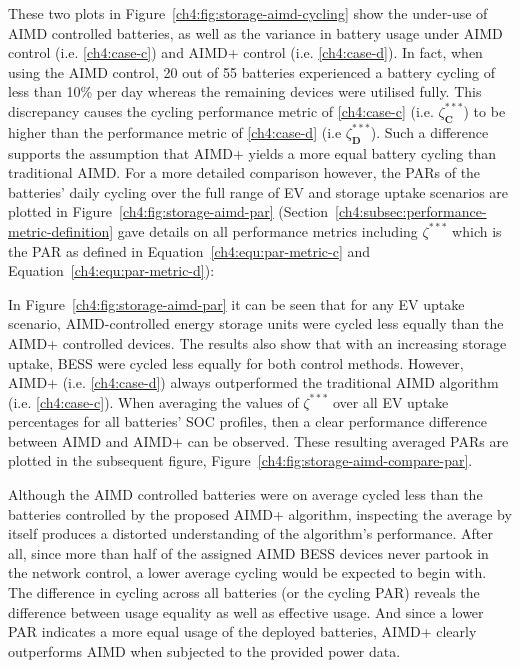 These two plots in Figure~\ref{ch4:fig:storage-aimd-cycling} show the under-use of AIMD controlled batteries, as well as the variance in battery usage under AIMD control (i.e. \ref{ch4:case-c}) and AIMD+ control (i.e. \ref{ch4:case-d}).
In fact, when using the AIMD control, 20 out of 55 batteries experienced a battery cycling of less than 10\% per day whereas the remaining devices were utilised fully.
This discrepancy causes the cycling performance metric of \ref{ch4:case-c} (i.e. $\zeta_\textbf{C}^{***}$) to be higher than the performance metric of \ref{ch4:case-d} (i.e $\zeta_\textbf{D}^{***}$).
Such a difference supports the assumption that AIMD+ yields a more equal battery cycling than traditional AIMD.
For a more detailed comparison however, the PARs of the batteries' daily cycling over the full range of EV and storage uptake scenarios are plotted in Figure~\ref{ch4:fig:storage-aimd-par} (Section~\ref{ch4:subsec:performance-metric-definition} gave details on all performance metrics including $\zeta^{***}$ which is the PAR as defined in Equation~\ref{ch4:equ:par-metric-c} and Equation~\ref{ch4:equ:par-metric-d}):



In Figure~\ref{ch4:fig:storage-aimd-par} it can be seen that for any EV uptake scenario, AIMD-controlled energy storage units were cycled less equally than the AIMD+ controlled devices.
The results also show that with an increasing storage uptake, BESS were cycled less equally for both control methods.
However, AIMD+ (i.e. \ref{ch4:case-d}) always outperformed the traditional AIMD algorithm (i.e. \ref{ch4:case-c}).
When averaging the values of $\zeta^{***}$ over all EV uptake percentages for all batteries' SOC profiles, then a clear performance difference between AIMD and AIMD+ can be observed.
These resulting averaged PARs are plotted in the subsequent figure, Figure~\ref{ch4:fig:storage-aimd-compare-par}.



Although the AIMD controlled batteries were on average cycled less than the batteries controlled by the proposed AIMD+ algorithm, inspecting the average by itself produces a distorted understanding of the algorithm's performance.
After all, since more than half of the assigned AIMD BESS devices never partook in the network control, a lower average cycling would be expected to begin with.
The difference in cycling across all batteries (or the cycling PAR) reveals the difference between usage equality as well as effective usage.
And since a lower PAR indicates a more equal usage of the deployed batteries, AIMD+ clearly outperforms AIMD when subjected to the provided power data.
